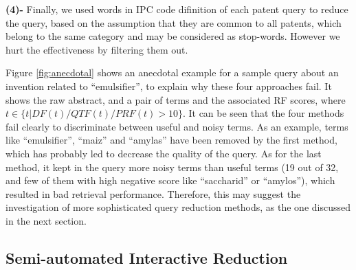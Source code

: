 \noindent \textbf{(4)-} Finally, we used words in IPC code difinition of each patent query to reduce the query, based on the assumption that they are common to all patents, which belong to the same category and may be considered as stop-words. However we hurt the effectiveness by filtering them out.

Figure \ref{fig:anecdotal} shows an anecdotal example for a sample query about an invention related to ``emulsifier'', to explain why these four approaches fail. It shows the raw abstract, and a pair of terms and the associated RF scores, where $t \in \{t| DF(t)/QTF(t)/PRF(t)>10\} $. It can be seen that the four methods fail clearly to discriminate between useful and noisy terms. As an example, terms like ``emulsifier'', ``maiz'' and ``amylas'' have been removed by the first method, which has probably led to decrease the quality of the query. As for the last method, it kept in the query more noisy terms than useful terms (19 out of 32, and few of them with high negative score like ``saccharid'' or ``amylos''), which resulted in bad retrieval performance. Therefore, this may suggest the investigation of more sophisticated query reduction methods, as the one discussed in the next section.
 


\subsection{Semi-automated Interactive Reduction}

\label{sec:SemiAutomatedInteractiveReduction}


